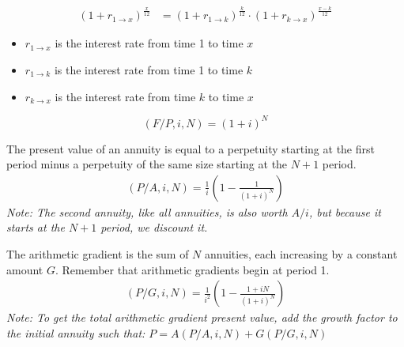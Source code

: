 \begin{theorem}
    \begin{align*}
        (1 + r_{1 \to x})^{\frac{x}{12}} & = (1 + r_{1 \to k})^{\frac{k}{12}} \cdot (1 + r_{k \to x})^{\frac{x-k}{12}}
    \end{align*}
    \begin{itemize}
        \item $r_{1 \to x}$ is the interest rate from time 1 to time $x$
        \item $r_{1 \to k}$ is the interest rate from time 1 to time $k$
        \item $r_{k \to x}$ is the interest rate from time $k$ to time $x$
    \end{itemize}
\end{theorem}

\begin{corollary}
    \[
        (F/P, i, N) = (1+i)^N
    \]
\end{corollary}

\begin{definition}
    The present value of an annuity is equal to a perpetuity starting at the first period minus a perpetuity of the same size starting at the $N+1$ period.
    \begin{align}
        \boxed{(P/A, i, N) = \frac{1}{i}( 1 - \frac{1}{(1+i)^{N}})}
    \end{align}
    \textit{Note: The second annuity, like all annuities, is also worth $A/i$, but because it starts at the $N+1$ period, we discount it.}
\end{definition}


\begin{definition}
    The arithmetic gradient is the sum of $N$ annuities, each increasing by a constant amount $G$. Remember that arithmetic gradients begin at period 1.
    \begin{align*}
        \boxed{(P/G, i, N) = \frac{1}{i^2}\left(1 - \frac{1+iN}{(1 + i)^N}\right)}
    \end{align*}
    \textit{Note: To get the total arithmetic gradient present value, add the growth factor to the initial annuity such that: $P = A(P/A, i, N) + G(P/G, i, N)$}
\end{definition}

